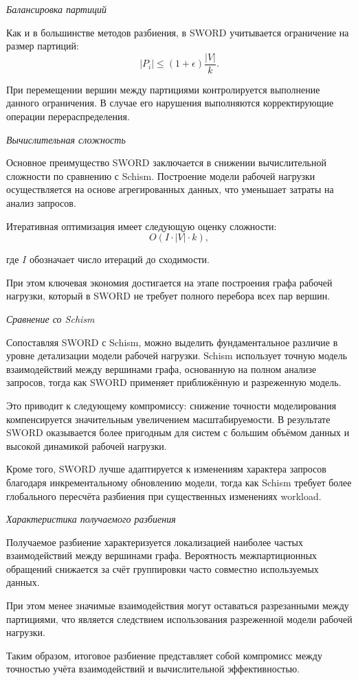 \textit{Балансировка партиций}

Как и в большинстве методов разбиения, в SWORD учитывается ограничение на размер партиций:
\begin{equation*}
|P_i| \leq (1 + \epsilon)\frac{|V|}{k}.
\end{equation*}

При перемещении вершин между партициями контролируется выполнение данного ограничения. В случае его нарушения выполняются корректирующие операции перераспределения.

\textit{Вычислительная сложность}

Основное преимущество SWORD заключается в снижении вычислительной сложности по сравнению с Schism. Построение модели рабочей нагрузки осуществляется на основе агрегированных данных, что уменьшает затраты на анализ запросов.

Итеративная оптимизация имеет следующую оценку сложности:
\begin{equation*}
O(I \cdot |V| \cdot k),
\end{equation*}

где $I$ обозначает число итераций до сходимости.

При этом ключевая экономия достигается на этапе построения графа рабочей нагрузки, который в SWORD не требует полного перебора всех пар вершин.

\textit{Сравнение со Schism}

Сопоставляя SWORD с Schism, можно выделить фундаментальное различие в уровне детализации модели рабочей нагрузки. Schism использует точную модель взаимодействий между вершинами графа, основанную на полном анализе запросов, тогда как SWORD применяет приближённую и разреженную модель.

Это приводит к следующему компромиссу: снижение точности моделирования компенсируется значительным увеличением масштабируемости. В результате SWORD оказывается более пригодным для систем с большим объёмом данных и высокой динамикой рабочей нагрузки.

Кроме того, SWORD лучше адаптируется к изменениям характера запросов благодаря инкрементальному обновлению модели, тогда как Schism требует более глобального пересчёта разбиения при существенных изменениях workload.

\textit{Характеристика получаемого разбиения}

Получаемое разбиение характеризуется локализацией наиболее частых взаимодействий между вершинами графа. Вероятность межпартиционных обращений снижается за счёт группировки часто совместно используемых данных.

При этом менее значимые взаимодействия могут оставаться разрезанными между партициями, что является следствием использования разреженной модели рабочей нагрузки.

Таким образом, итоговое разбиение представляет собой компромисс между точностью учёта взаимодействий и вычислительной эффективностью.
